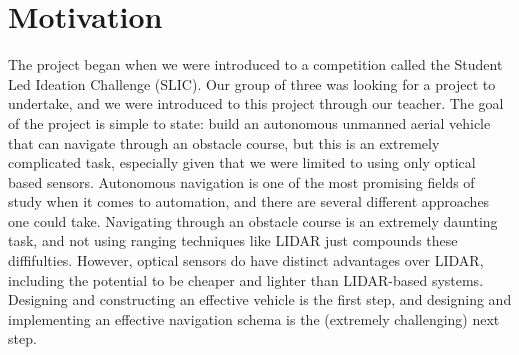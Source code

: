 \documentclass{article}
\begin{document}
\section{Motivation}
The project began when we were introduced to a competition called the Student Led Ideation Challenge (SLIC). Our group of three was looking for a project to undertake, and we were introduced to this project through our teacher. The goal of the project is simple to state: build an autonomous unmanned aerial vehicle that can navigate through an obstacle course, but this is an extremely complicated task, especially given that we were limited to using only optical based sensors. Autonomous navigation is one of the most promising fields of study when it comes to automation, and there are several different approaches one could take. Navigating through an obstacle course is an extremely daunting task, and not using ranging techniques like LIDAR just compounds these diffifulties. However, optical sensors do have distinct advantages over LIDAR, including the potential to be cheaper and lighter than LIDAR-based systems. Designing and constructing an effective vehicle is the first step, and designing and implementing an effective navigation schema is the (extremely challenging) next step.
\end{document}
